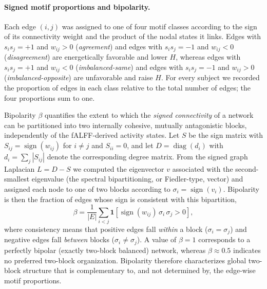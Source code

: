 \documentclass[10pt,letterpaper]{article}
\begin{document}
\paragraph*{Signed motif proportions and bipolarity.}
Each edge $(i,j)$ was assigned to one of four motif classes according to the sign of its
connectivity weight and the product of the nodal states it links. Edges with $s_i s_j = +1$ and
$w_{ij} > 0$ (\emph{agreement}) and edges with $s_i s_j = -1$ and $w_{ij} < 0$ (\emph{disagreement})
are energetically favorable and lower $H$, whereas edges with $s_i s_j = +1$ and $w_{ij} < 0$
(\emph{imbalanced-same}) and edges with $s_i s_j = -1$ and $w_{ij} > 0$ (\emph{imbalanced-opposite})
are unfavorable and raise $H$. For every subject we recorded the proportion of edges in each class
relative to the total number of edges; the four proportions sum to one.

Bipolarity $\beta$ quantifies the extent to which the \emph{signed connectivity} of a network can be
partitioned into two internally cohesive, mutually antagonistic blocks, independently of the
fALFF-derived activity states. Let $S$ be the sign matrix with $S_{ij} = \operatorname{sign}(w_{ij})$
for $i \neq j$ and $S_{ii} = 0$, and let $D = \operatorname{diag}(d_i)$ with $d_i = \sum_{j} |S_{ij}|$
denote the corresponding degree matrix. From the signed graph Laplacian $L = D - S$ we computed the
eigenvector $v$ associated with the second-smallest eigenvalue (the spectral bipartitioning, or
Fiedler-type, vector) and assigned each node to one of two blocks according to $\sigma_i =
\operatorname{sign}(v_i)$. Bipolarity is then the fraction of edges whose sign is consistent with
this bipartition,
\begin{equation}
\beta = \frac{1}{|E|}\sum_{i<j}
\mathbf{1}\!\left[\operatorname{sign}(w_{ij})\,\sigma_i\,\sigma_j > 0\right],
\label{eq:bipolarity}
\end{equation}
where consistency means that positive edges fall \emph{within} a block ($\sigma_i = \sigma_j$) and
negative edges fall \emph{between} blocks ($\sigma_i \neq \sigma_j$). A value of $\beta = 1$
corresponds to a perfectly bipolar (exactly two-block balanced) network, whereas $\beta \approx 0.5$
indicates no preferred two-block organization. Bipolarity therefore characterizes global two-block
structure that is complementary to, and not determined by, the edge-wise motif proportions.
\end{document}
